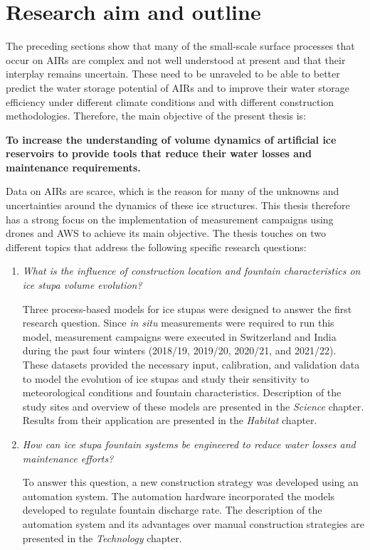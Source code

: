 \section{Research aim and outline}

The preceding sections show that many of the small-scale surface processes that occur on \ac{AIRs} are complex
and not well understood at present and that their interplay remains uncertain. These need to be unraveled to be able to better predict the
water storage potential of \ac{AIRs} and to improve their water storage efficiency under different climate conditions and with different
construction methodologies. Therefore, the main objective of the present thesis is:

\begin{thesis_quotation}

  \textbf{To increase the understanding of volume dynamics of artificial ice reservoirs to
  provide tools that reduce their water losses and maintenance requirements.}

\end{thesis_quotation}

Data on \ac{AIRs} are scarce, which is the reason for many of the unknowns and uncertainties around the dynamics
of these ice structures. This thesis therefore has a strong focus on the implementation of measurement campaigns
using drones and \ac{AWS} to achieve its main objective. The thesis touches on two different topics that
address the following specific research questions:

\begin{enumerate}

  \item \textit{What is the influence of construction location and fountain characteristics on ice stupa volume
    evolution?}

Three process-based models for ice stupas were designed to answer the first research question. Since \textit{in situ}
    measurements were required to run this model, measurement campaigns were executed in Switzerland and India
    during the past four winters (2018/19, 2019/20, 2020/21, and 2021/22). These datasets provided the necessary
    input, calibration, and validation data to model the evolution of ice stupas and study their sensitivity to
    meteorological conditions and fountain characteristics. Description of the study sites and overview of these
    models are presented in the \textit{Science} chapter. Results from their application are presented in the
    \textit{Habitat} chapter.

  \item \textit{How can ice stupa fountain systems be engineered to reduce water losses and maintenance
    efforts?}

To answer this question, a new construction strategy was developed using an automation system. The automation
    hardware incorporated the models developed to regulate fountain discharge rate. The description of the
    automation system and its advantages over manual construction strategies are presented in the
    \textit{Technology} chapter.

\end{enumerate}


